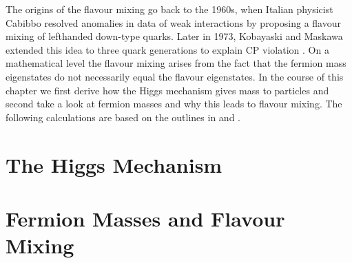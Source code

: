 The origins of the flavour mixing go back to the 1960s, when Italian physicist Cabibbo resolved anomalies in data of weak interactions by proposing a flavour mixing of lefthanded down-type quarks. Later in 1973, Kobayaski and Maskawa extended this idea to three quark generations to explain CP violation \cite{Griffiths}. On a mathematical level the flavour mixing arises from the fact that the fermion mass eigenstates do not necessarily equal the flavour eigenstates. In the course of this chapter we first derive how the Higgs mechanism gives mass to particles and second take a look at fermion masses and why this leads to flavour mixing. The following calculations are based on the outlines in \cite[Chapter 20]{Peskin} and \cite[Chapter 1.2.1]{Tevatron}.



\section{The Higgs Mechanism}

\section{Fermion Masses and Flavour Mixing}
